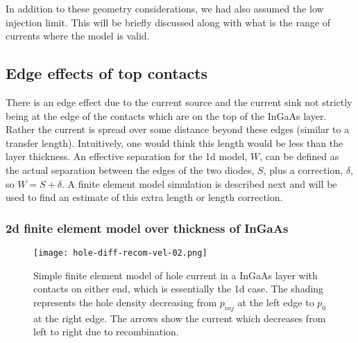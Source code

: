 In addition to these geometry considerations, we had also assumed the low
 injection limit. This will be briefly discussed along with
what is  the range of currents where
the model is valid.


\subsection{Edge effects of top contacts}

There is an edge effect due to the current source and the current sink not
 strictly being at the edge of the contacts which are on the top of the
InGaAs layer.  Rather the current is spread over some distance beyond
these edges (similar to a transfer length).  Intuitively, one would think
this length would be less than the layer thickness.
An effective separation for the 1d model, $W$, can be defined as the actual
 separation between the edges of the two diodes, $S$, plus a correction, $\delta$,
so $W=S+\delta$.
  A finite element
model simulation is described next and  will be used to find an estimate
 of this extra length or length correction.


   \subsubsection{2d finite element model over thickness of InGaAs}


\begin{figure}[b]
\centering
\texttt{[image: hole-diff-recom-vel-02.png]}
\caption{Simple finite element model of hole current in a InGaAs layer
with contacts on either end, which is essentially the 1d case.
The shading represents the hole density decreasing from $p_{inj}$ at
the left edge to $p_0$ at the right edge.  The arrows show the current
which decreases from left to right due to recombination.
}%
\label{fig:hole-diff-recom-vel-02}
\end{figure}

